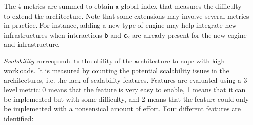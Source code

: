 \documentclass[preprint,3p,twocolumn]{elsarticle}
\newcommand{\note}[2]{\pdfmargincomment[color=yellow,author=#1,open=true]{#2}}
\newcommand{\closednote}[4]{} %
\begin{document}
The 4 metrics are summed to obtain a global index that measures the
difficulty to extend the architecture. Note that some extensions may
involve several metrics in practice. For instance, adding a new type
of engine may help integrate new infrastructures when interactions
\texttt{b} and \texttt{c$_2$} are already present for the new engine
and infrastructure.  \closednote{Rafael}{Adding a new engine type may
  also allow run in different infrastructures. Maybe it is worth to
  put a sentence to clarify that the metric account for it
  separately.}{Tristan}{It will not *allow* because interaction c1
  would still need to be developed. But it will definitely facilitate
  it. I added a note on this after the description of the metrics.}


\emph{Scalability} corresponds to the ability of the architecture to
cope with high workloads. It is measured by counting the potential
scalability issues in the architectures, i.e. the lack of scalability
features. Features are evaluated using a 3-level metric: 0 means that
the feature is very easy to enable, 1 means that it can be implemented
but with some difficulty, and 2 means that the feature could only be
implemented with a nonsensical amount of effort. Four different
features are identified:
\end{document}
